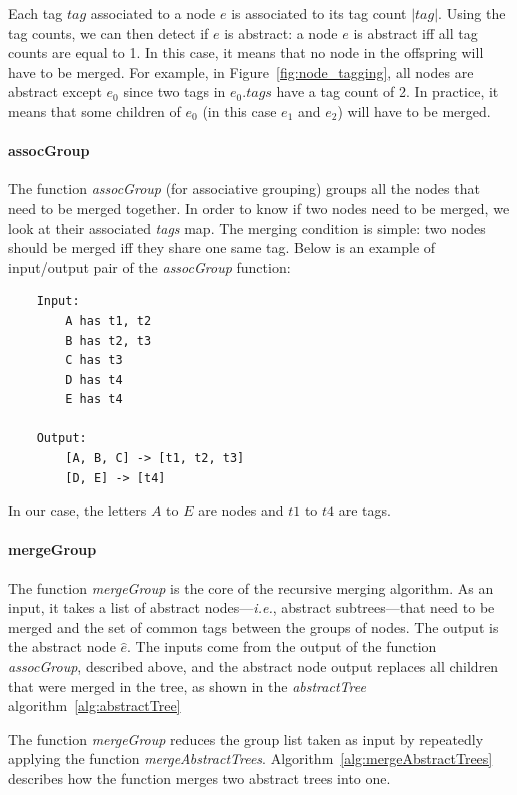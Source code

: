 Each tag $tag$ associated to a node $e$ is associated to its tag count $|tag|$.
Using the tag counts, we can then detect if $e$ is abstract: a node $e$ is abstract iff all tag counts are equal to 1.
In this case, it means that no node in the offspring will have to be merged.
For example, in Figure~\ref{fig:node_tagging}, all nodes are abstract except $e_{0}$ since two tags in $e_{0}.tags$ have a tag count of 2.
In practice, it means that some children of $e_{0}$ (in this case $e_{1}$ and $e_{2}$) will have to be merged.

\paragraph{assocGroup}\label{par:assocGroup}
The function \emph{assocGroup} (for associative grouping) groups all the nodes that need to be merged together.
In order to know if two nodes need to be merged, we look at their associated \emph{tags} map.
The merging condition is simple: two nodes should be merged iff they share one same tag.
Below is an example of input/output pair of the \emph{assocGroup} function:
\begin{lstlisting}
    Input:
        A has t1, t2
        B has t2, t3
        C has t3
        D has t4
        E has t4

    Output:
        [A, B, C] -> [t1, t2, t3]
        [D, E] -> [t4]
\end{lstlisting}

In our case, the letters $A$ to $E$ are nodes and $t1$ to $t4$ are tags.

\paragraph{mergeGroup}\label{par:mergeGroup}
The function \emph{mergeGroup} is the core of the recursive merging algorithm.
As an input, it takes a list of abstract nodes---\emph{i.e.}, abstract subtrees---that need to be merged and the set of common tags between the groups of nodes.
The output is the abstract node $\hat{e}$.
The inputs come from the output of the function \emph{assocGroup}, described above, and the abstract node output replaces all children that were merged in the tree, as shown in the \emph{abstractTree} algorithm~\ref{alg:abstractTree}

The function \emph{mergeGroup} reduces the group list taken as input by repeatedly applying the function \emph{mergeAbstractTrees}.
Algorithm~\ref{alg:mergeAbstractTrees} describes how the function merges two abstract trees into one.

